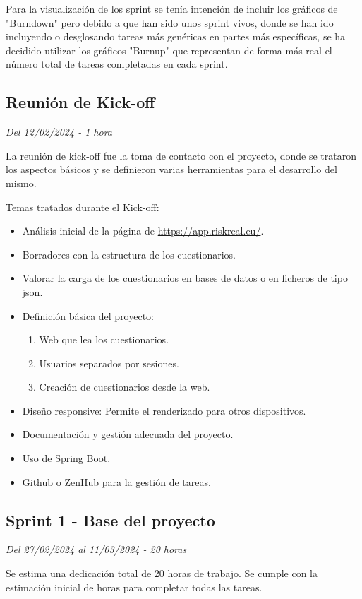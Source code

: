 Para la visualización de los sprint se tenía intención de incluir los gráficos de "Burndown" pero debido a que han sido unos sprint vivos, donde se han ido incluyendo o desglosando tareas más genéricas en partes más específicas, se ha decidido utilizar los gráficos "Burnup" que representan de forma más real el número total de tareas completadas en cada sprint.

\subsection{Reunión de Kick-off}
\textit{Del 12/02/2024 - 1 hora}

La reunión de kick-off fue la toma de contacto con el proyecto, donde se trataron los aspectos básicos y se definieron varias herramientas para el desarrollo del mismo.

Temas tratados durante el Kick-off:
\begin{itemize}
	\item
	Análisis inicial de la página de \url{https://app.riskreal.eu/}.
	\item
	Borradores con la estructura de los cuestionarios.
	\item
	Valorar la carga de los cuestionarios en bases de datos o en ficheros de tipo json.
	\item
	Definición básica del proyecto:
	\begin{enumerate}
		\item
		Web que lea los cuestionarios.
		\item
		Usuarios separados por sesiones.
		\item
		Creación de cuestionarios desde la web.
	\end{enumerate}
	\item
	Diseño responsive: Permite el renderizado para otros dispositivos.
	\item
	Documentación y gestión adecuada del proyecto.
	\item
	Uso de Spring Boot.
	\item
	Github o ZenHub para la gestión de tareas.
\end{itemize}


\subsection{Sprint 1 - Base del proyecto}
\textit{Del 27/02/2024 al 11/03/2024 - 20 horas}

Se estima una dedicación total de 20 horas de trabajo.
Se cumple con la estimación inicial de horas para completar todas las tareas.

